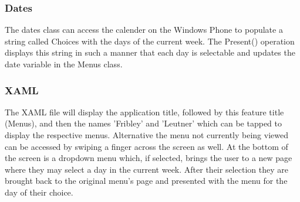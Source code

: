 \documentclass[pdftex,12pt,letter]{article}
\begin{document}
\subsubsection{Dates}
The dates class can access the calender on the Windows Phone to populate a string called Choices with the days of the current week. The Present() operation displays this string in such a manner that each day is selectable and updates the date variable in the Menus class.
\subsubsection{XAML}
The XAML file will display the application title, followed by this feature title
(Menus), and then the names 'Fribley' and 'Leutner' which can be tapped to display the respective menus. Alternative the menu not currently being viewed can be accessed by swiping a finger across the screen as well. At the bottom of the screen is a dropdown menu which, if selected, brings the user to a new page where they may select a day in the current week. After their selection they are brought back to the original menu's page and presented with the menu for the day of their choice.
\end{document}
